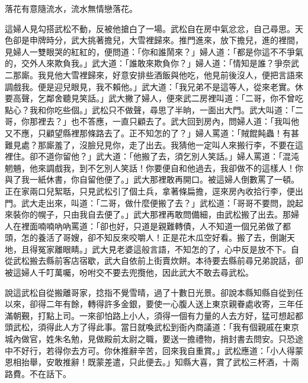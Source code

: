 \begin{showcontents}{}
落花有意隨流水，流水無情戀落花。

這婦人見勾搭武松不動，反被他搶白了一場。武松自在房中氣忿忿，自己尋思。天色卻是申牌時分，武大挑著擔兒，大雪裡歸來。推門進來，放下擔兒，進的裡間，見婦人一雙眼哭的紅紅的，便問道：「你和誰鬧來？」婦人道：「都是你這不不爭氣的，交外人來欺負我。」武大道：「誰敢來欺負你？」婦人道：「情知是誰？爭奈武二那廝。我見他大雪裡歸來，好意安排些酒飯與他吃，他見前後沒人，便把言語來調戲我。便是迎兒眼見，我不賴他。」武大道：「我兄弟不是這等人，從來老實。休要高聲，乞鄰舍聽見笑話。」武大撇了婦人，便來武二房裡叫道：「二哥，你不曾吃點心？我和你吃些個。」武松只不做聲，尋思了半晌，一面出大門。武大叫道：「二哥，你那裡去？」也不答應，一直只顧去了。武大回到房內，問婦人道：「我叫他又不應，只顧望縣裡那條路去了。正不知怎的了？」婦人罵道：「賊餛飩蟲！有甚難見處？那廝羞了，沒臉兒見你，走了出去。我猜他一定叫人來搬行李，不要在這裡住。卻不道你留他？」武大道：「他搬了去，須乞別人笑話。」婦人罵道：「混沌魍魎，他來調戲我，到不乞別人笑話！你要便自和他過去，我卻做不的這樣人！你與了我一紙休書，你自留他便了。」武大那裡敢再開口。被這婦人倒數罵了一頓。正在家兩口兒絮聒，只見武松引了個土兵，拿著條扁擔，逕來房內收拾行李，便出門。武大走出來，叫道：「二哥，做什麼便搬了去？」武松道：「哥哥不要問，說起來裝你的幌子，只由我自去便了。」武大那裡再敢問備細，由武松搬了出去。那婦人在裡面喃喃吶吶罵道：「卻也好，只道是親難轉債，人不知道一個兄弟做了都頭，怎的養活了哥嫂，卻不知反來咬嚼人！正是花木瓜空好看。搬了去，倒謝天地，且得冤家離眼睛。」武大見老婆這般言語，不知怎的了，心中反是放不下。自從武松搬去縣前客店宿歇，武大自依前上街賣炊餅。本待要去縣前尋兄弟說話，卻被這婦人千叮萬囑，吩咐交不要去兜攬他，因此武大不敢去尋武松。

說這武松自從搬離哥家，捻指不覺雪晴，過了十數日光景。卻說本縣知縣自從到任以來，卻得二年有餘，轉得許多金銀，要使一心腹人送上東京親眷處收寄，三年任滿朝覲，打點上司。一來卻怕路上小人，須得一個有力量的人去方好，猛可想起都頭武松，須得此人方了得此事。當日就喚武松到衙內商議道：「我有個親戚在東京城內做官，姓朱名勉，見做殿前太尉之職，要送一擔禮物，捎封書去問安。只恐途中不好行，若得你去方可。你休推辭辛苦，回來我自重賞。」武松應道：「小人得蒙恩相抬舉，安敢推辭！既蒙差遣，只此便去。」知縣大喜，賞了武松三杯酒，十兩路費。不在話下。


\end{showcontents}
